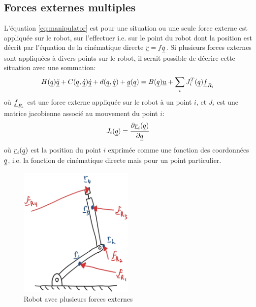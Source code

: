 \subsection{Forces externes multiples}

L'équation \eqref{eq:manipulator} est pour une situation ou une seule force externe est appliquée sur le robot, sur l'effectuer i.e. sur le point du robot dont la position est décrit par l'équation de la cinématique directe $\underline{r} = f\underline{q}$. Si plusieurs forces externes sont appliquées à divers points sur le robot, il serait possible de décrire cette situation avec une sommation:
\begin{align}
H(\underline{q}) \underline{\ddot{q}} + C(\underline{q},\underline{\dot{q}}) \underline{\dot{q}} + d(\underline{q}, \underline{\dot{q}}) + \underline{g}(\underline{q}) = B(\underline{q}) \underline{u}  + \sum_i J_i^T(\underline{q}) \underline{f}_{R_i} 
\end{align}
où $\underline{f}_{R_i}$ est une force externe appliquée sur le robot à un point $i$, et $J_i$ est une matrice jacobienne associé au mouvement du point $i$:
\begin{align}
J_i(\underline{q}) = \frac{ \partial \underline{r}_i(\underline{q}) }{ \partial \underline{q} }
\end{align}
où $\underline{r}_i(\underline{q})$ est la position du point $i$ exprimée comme une fonction des coordonnées $\underline{q}$, i.e. la fonction de cinématique directe mais pour un point particulier. 

\begin{figure}[H]
	\centering
		\includegraphics[width=0.50\textwidth]{fig/multipleexternalforces.jpg}
	\caption{Robot avec plusieurs forces externes}%
	\label{fig:multipleexternalforces}
\end{figure}


